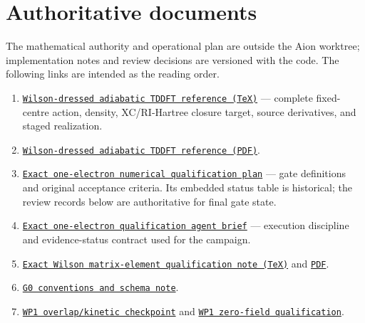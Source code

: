 \documentclass[11pt]{article}
\newcommand{\filelink}[2]{\href{run:#2}{\texttt{#1}}}
\begin{document}
\section{Authoritative documents}\label{sec:document-index}

The mathematical authority and operational plan are outside the Aion
worktree; implementation notes and review decisions are versioned with the
code.  The following links are intended as the reading order.

\begin{enumerate}
  \item \filelink{Wilson-dressed adiabatic TDDFT reference (TeX)}{/home/cgs/00_WORK/Projection_Full_Formalism/REVIEW/implementation/wilson_dressed_adiabatic_tddft_reference.tex} --- complete fixed-centre action, density, XC/RI-Hartree closure target, source derivatives, and staged realization.
  \item \filelink{Wilson-dressed adiabatic TDDFT reference (PDF)}{/home/cgs/00_WORK/Projection_Full_Formalism/REVIEW/implementation/wilson_dressed_adiabatic_tddft_reference.pdf}.
  \item \filelink{Exact one-electron numerical qualification plan}{/home/cgs/00_WORK/Projection_Full_Formalism/REVIEW/implementation/exact_one_electron_numerical_qualification_plan.md} --- gate definitions and original acceptance criteria.  Its embedded status table is historical; the review records below are authoritative for final gate state.
  \item \filelink{Exact one-electron qualification agent brief}{/home/cgs/00_WORK/Projection_Full_Formalism/REVIEW/implementation/aion_exact_one_electron_qualification_agent_prompt.md} --- execution discipline and evidence-status contract used for the campaign.
  \item \filelink{Exact Wilson matrix-element qualification note (TeX)}{/home/cgs/00_WORK/Projection_Full_Formalism/REVIEW/implementation/exact_wilson_matrix_element_qualification.tex} and \filelink{PDF}{/home/cgs/00_WORK/Projection_Full_Formalism/REVIEW/implementation/exact_wilson_matrix_element_qualification.pdf}.
  \item \filelink{G0 conventions and schema note}{/home/cgs/00_WORK/Projection_Code/aion-magnetic-matrix-benchmark/docs/exact_one_electron_qualification_g0.md}.
  \item \filelink{WP1 overlap/kinetic checkpoint}{/home/cgs/00_WORK/Projection_Code/aion-magnetic-matrix-benchmark/docs/exact_one_electron_wp1_overlap_kinetic_checkpoint.md} and \filelink{WP1 zero-field qualification}{/home/cgs/00_WORK/Projection_Code/aion-magnetic-matrix-benchmark/docs/exact_one_electron_wp1_zero_field_qualification.md}.

\end{enumerate}
\end{document}
